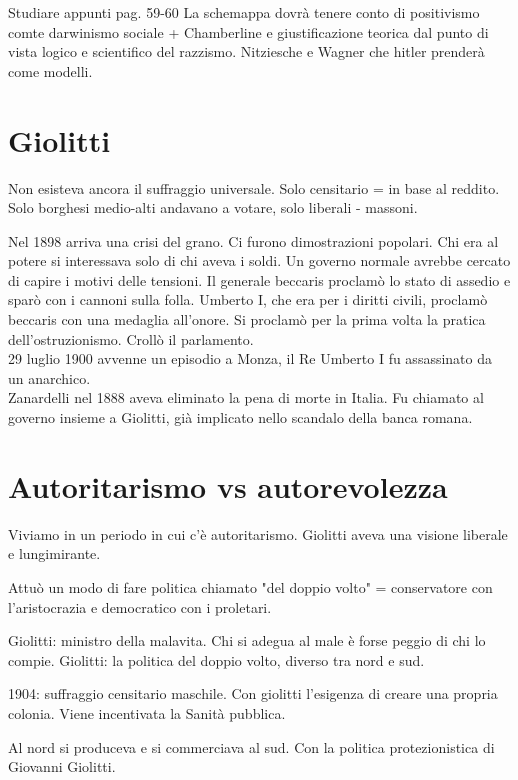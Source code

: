 \documentclass{article}
\begin{document}
    Studiare appunti pag. 59-60
    La schemappa dovrà tenere conto di positivismo comte darwinismo sociale + Chamberline e giustificazione teorica dal punto di vista logico e scientifico del razzismo. Nitziesche e Wagner che hitler prenderà come modelli.

    \section{Giolitti}

    Non esisteva ancora il suffraggio universale. Solo censitario = in base al reddito. Solo borghesi medio-alti andavano a votare, solo liberali - massoni.

    Nel 1898 arriva una crisi del grano. Ci furono dimostrazioni popolari. Chi era al potere si interessava solo di chi aveva i soldi. Un governo normale avrebbe cercato di capire i motivi delle tensioni. Il generale beccaris proclamò lo stato di assedio e sparò con i cannoni sulla folla. Umberto I, che era per i diritti civili, proclamò beccaris con una medaglia all'onore. Si proclamò per la prima volta la pratica dell'ostruzionismo. Crollò il parlamento.\\
    29 luglio 1900 avvenne un episodio a Monza, il Re Umberto I fu assassinato da un anarchico.\\
    Zanardelli nel 1888 aveva eliminato la pena di morte in Italia. Fu chiamato al governo insieme a Giolitti, già implicato nello scandalo della banca romana.


    \section{Autoritarismo vs autorevolezza}

    Viviamo in un periodo in cui c'è autoritarismo.
    Giolitti aveva una visione liberale e lungimirante.

    Attuò un modo di fare politica chiamato "del doppio volto" = conservatore con l'aristocrazia e democratico con i proletari.

    Giolitti: ministro della malavita. Chi si adegua al male è forse peggio di chi lo compie.
    Giolitti: la politica del doppio volto, diverso tra nord e sud.

    1904: suffraggio censitario maschile.
    Con giolitti l'esigenza di creare una propria colonia.
    Viene incentivata la Sanità pubblica.

    Al nord si produceva e si commerciava al sud. Con la politica protezionistica di Giovanni Giolitti.
\end{document}
